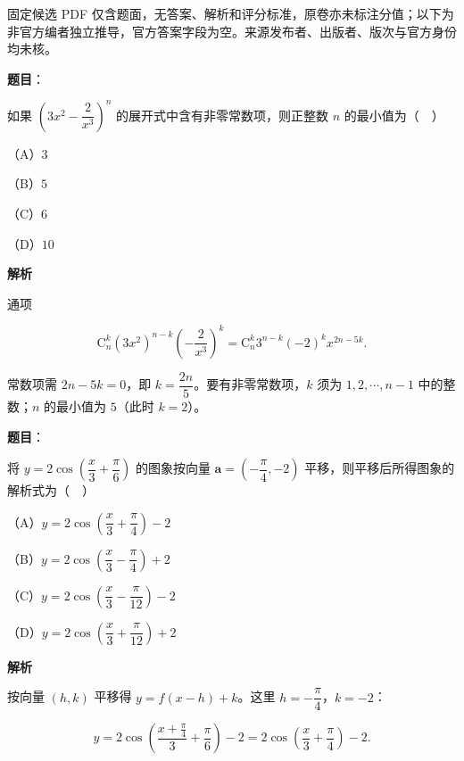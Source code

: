 

\begin{gktip}
固定候选 PDF 仅含题面，无答案、解析和评分标准，原卷亦未标注分值；以下为非官方编者独立推导，官方答案字段为空。来源发布者、出版者、版次与官方身份均未核。
\end{gktip}

\begin{answer}

\textbf{题目}：

如果 $\left(3x^2-\dfrac2{x^3}\right)^n$ 的展开式中含有非零常数项，则正整数 $n$ 的最小值为（　）

（A）$3$

（B）$5$

（C）$6$

（D）$10$

\textbf{解析}

通项

\nopagebreak[4]
\[\mathrm C_n^k\left(3x^2\right)^{n-k}\left(-\frac2{x^3}\right)^k=\mathrm C_n^k3^{n-k}(-2)^kx^{2n-5k}.\]

常数项需 $2n-5k=0$，即 $k=\dfrac{2n}5$。要有非零常数项，$k$ 须为 $1,2,\cdots,n-1$ 中的整数；$n$ 的最小值为 $5$（此时 $k=2$）。


\end{answer}
\begin{answer}

\textbf{题目}：

将 $y=2\cos\left(\dfrac x3+\dfrac{\pi}6\right)$ 的图象按向量 $\boldsymbol a=\left(-\dfrac{\pi}4,-2\right)$ 平移，则平移后所得图象的解析式为（　）

（A）$y=2\cos\left(\dfrac x3+\dfrac{\pi}4\right)-2$

（B）$y=2\cos\left(\dfrac x3-\dfrac{\pi}4\right)+2$

（C）$y=2\cos\left(\dfrac x3-\dfrac{\pi}{12}\right)-2$

（D）$y=2\cos\left(\dfrac x3+\dfrac{\pi}{12}\right)+2$

\textbf{解析}

按向量 $(h,k)$ 平移得 $y=f(x-h)+k$。这里 $h=-\dfrac{\pi}4$，$k=-2$：

\nopagebreak[4]
\[y=2\cos\left(\frac{x+\frac{\pi}4}3+\frac{\pi}6\right)-2=2\cos\left(\frac x3+\frac{\pi}4\right)-2.\]


\end{answer}
